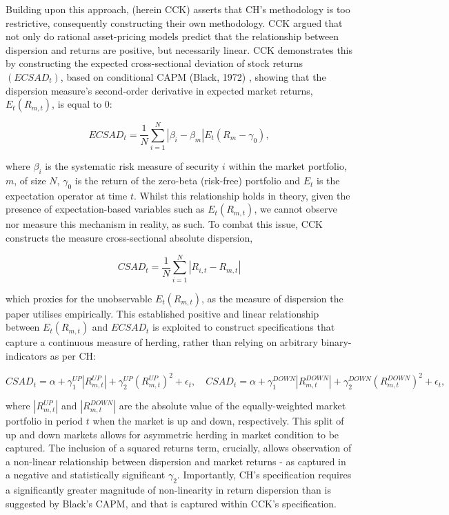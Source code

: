 \documentclass[12pt]{article}
\numberwithin{table}{section}   %
\begin{document}
Building upon this approach, \citet{cck} (herein CCK) asserts that CH’s methodology is too restrictive, consequently constructing their own methodology. CCK argued that not only do rational asset-pricing models predict that the relationship between dispersion and returns are positive, but necessarily linear. CCK demonstrates this by constructing the expected cross-sectional deviation of stock returns $(ECSAD_t)$, based on conditional CAPM (Black, 1972) , showing that the dispersion measure’s second-order derivative in expected market returns, $E_t(R_{m,t})$, is equal to 0:

$$
ECSAD_t=\frac{1}{N}\sum^N_{i=1}|\beta_i-\beta_m|E_t(R_m-\gamma_0),
$$

where $\beta_i$ is the systematic risk measure of security $i$ within the market portfolio, $m$, of size $N$, $\gamma_0$ is the return of the zero-beta (risk-free) portfolio and $E_t$ is the expectation operator at time $t$. Whilst this relationship holds in theory, given the presence of expectation-based variables such as $E_t(R_{m,t})$, we cannot observe nor measure this mechanism in reality, as such. To combat this issue, CCK constructs the measure cross-sectional absolute dispersion,

$$
CSAD_t=\frac{1}{N}\sum^N_{i=1}|R_{i,t}-R_{m,t}|
$$

which proxies for the unobservable $E_t(R_{m,t})$, as the measure of dispersion the paper utilises empirically. This established positive and linear relationship between $E_t(R_{m,t})$ and $ECSAD_t$ is exploited to construct specifications that capture a continuous measure of herding, rather than relying on arbitrary binary-indicators as per CH:

$$
CSAD_t=\alpha+\gamma_1^{UP}|R_{m,t}^{UP}|+\gamma_2^{UP}(R_{m,t}^{UP})^2+\epsilon_t, \quad CSAD_t=\alpha+\gamma_1^{DOWN}|R_{m,t}^{DOWN}|+\gamma_2^{DOWN}(R_{m,t}^{DOWN})^2+\epsilon_t,
$$

where $|R_{m,t}^{UP}|$ and $|R_{m,t}^{DOWN}|$ are the absolute value of the equally-weighted market portfolio in period $t$ when the market is up and down, respectively. This split of up and down markets allows for asymmetric herding in market condition to be captured. The inclusion of a squared returns term, crucially, allows observation of a non-linear relationship between dispersion and market returns - as captured in a negative and statistically significant $\gamma_2$. Importantly, CH’s specification requires a significantly greater magnitude of non-linearity in return dispersion than is suggested by Black’s CAPM, and that is captured within CCK’s specification.
\end{document}
